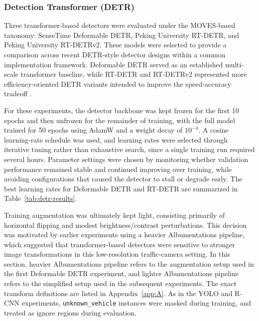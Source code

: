 
\subsubsection{Detection Transformer (DETR)}
\label{sec:detr}

Three transformer-based detectors were evaluated under the MOVES-based taxonomy: 
SenseTime Deformable DETR, Peking University RT-DETR, and Peking University RT-DETRv2. 
These models were selected to provide a comparison across recent DETR-style detector 
designs within a common implementation framework. Deformable DETR served as an 
established multi-scale transformer baseline, while RT-DETR and RT-DETRv2 represented 
more efficiency-oriented DETR variants intended to improve the speed-accuracy tradeoff 
\cite{detr2020,deformabledetr2020,rtdetr2024,rtdetrv22024}.

For these experiments, the detector backbone was kept frozen for the first 10 epochs 
and then unfrozen for the remainder of training, with the full model trained for 50 
epochs using AdamW and a weight decay of $10^{-4}$. A cosine learning-rate schedule
was used, and learning rates were selected through iterative tuning rather than 
exhaustive search, since a single training run required several hours. 
Parameter settings were chosen by monitoring whether validation performance remained 
stable and continued improving over training, while avoiding configurations that caused
the detector to stall or degrade early. The best learning rates for Deformable DETR 
and RT-DETR are summarized in Table~\ref{tab:detr-results}.

Training augmentation was ultimately kept light, consisting primarily of horizontal
flipping and modest brightness/contrast perturbations. This decision was motivated 
by earlier experiments using a heavier Albumentations pipeline, which suggested
that transformer-based detectors were sensitive to stronger image transformations
in this low-resolution traffic-camera setting. In this section, heavier Albumentations 
pipeline refers to the augmentation setup used in the first Deformable DETR 
experiment, and lighter Albumentations pipeline refers to the simplified setup used
in the subsequent experiments. The exact transform definitions are listed in Appendix~\ref{app:A}.
As in the YOLO and R-CNN experiments, \verb|unknown_vehicle| instances were masked 
during training, and treated as ignore regions during evaluation.

